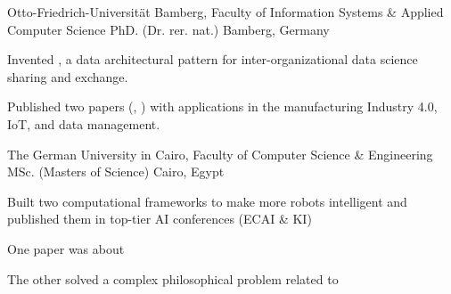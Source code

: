 \begin{cventries}



  \cventry
    {Otto-Friedrich-Universit\"{a}t Bamberg, Faculty of Information Systems \& Applied Computer Science}  %
    {PhD. (Dr. rer. nat.)} %
    {}%
    {Bamberg, Germany} %
    {	
      \begin{cvitems} %
		\item {Invented , a data architectural pattern for inter-organizational data science sharing and exchange.}
		\item {Published two papers (, ) with applications in the manufacturing Industry 4.0, IoT, and data management.}
    \end{cvitems}
    }
\vspace{4ex}


  \cventry
    {The German University in Cairo, Faculty of Computer Science \& Engineering}  %
    {MSc. (Masters of Science)} %
    {}%
    {Cairo, Egypt} %
    {	
      \begin{cvitems} %
		\item {Built two computational frameworks to make more robots intelligent and published them in top-tier AI conferences (ECAI \& KI)}
		\item {One paper was about }
		\item {The other solved a complex philosophical problem related to }
    \end{cvitems}
    }
    
    
\vspace{4ex}




\end{cventries}
